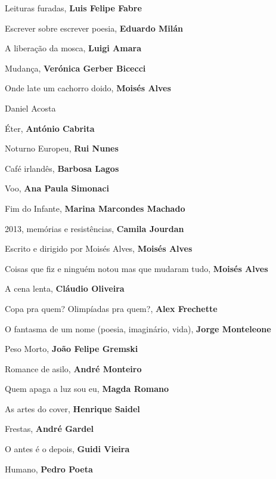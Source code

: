 \begin{multicols}{2}
\begin{enumerate}
{\item Leituras furadas, \textbf{Luis Felipe Fabre}
\item Escrever sobre escrever poesia, \textbf{Eduardo Milán}
\item A liberação da mosca, \textbf{Luigi Amara}
\item Mudança, \textbf{Verónica Gerber Bicecci}
\item Onde late um cachorro doido, \textbf{Moisés Alves}
\item Daniel Acosta
\item Éter, \textbf{António Cabrita}
\item Noturno Europeu, \textbf{Rui Nunes}
\item Café irlandês, \textbf{Barbosa Lagos}
\item Voo, \textbf{Ana Paula Simonaci}
\item Fim do Infante, \textbf{Marina Marcondes Machado}
\item 2013, memórias e resistências, \textbf{Camila Jourdan}
\item Escrito e dirigido por Moisés Alves, \textbf{Moisés Alves}
\item Coisas que fiz e ninguém notou mas que mudaram tudo, \textbf{Moisés Alves}
\item A cena lenta, \textbf{Cláudio Oliveira}
\item Copa pra quem? Olimpíadas pra quem?, \textbf{Alex Frechette}
\item O fantasma de um nome (poesia, imaginário, vida), \textbf{Jorge Monteleone}
\item Peso Morto, \textbf{João Felipe Gremski}
\item Romance de asilo, \textbf{André Monteiro}
\item Quem apaga a luz sou eu, \textbf{Magda Romano}
\item As artes do cover, \textbf{Henrique Saidel}
\item Frestas, \textbf{André Gardel}
\item O antes é o depois, \textbf{Guidi Vieira}
\item Humano, \textbf{Pedro Poeta}
}
\end{enumerate}
\end{multicols}

\pagebreak
